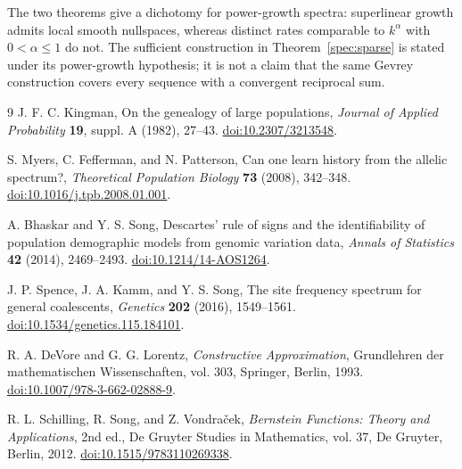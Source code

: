 \documentclass[11pt]{article}
\theoremstyle{definition}
\theoremstyle{remark}
\numberwithin{equation}{section}
\begin{document}
The two theorems give a dichotomy for power-growth spectra:
superlinear growth admits local smooth nullspaces, whereas distinct
rates comparable to $k^\alpha$ with $0<\alpha\le1$ do not.
The sufficient construction in Theorem~\ref{spec:sparse} is stated
under its power-growth hypothesis; it is not a claim that the same
Gevrey construction covers every sequence with a convergent
reciprocal sum.


\begin{thebibliography}{9}
J. F. C. Kingman,
On the genealogy of large populations,
\emph{Journal of Applied Probability} \textbf{19}, suppl. A
(1982), 27--43.
\href{https://doi.org/10.2307/3213548}{doi:10.2307/3213548}.

S. Myers, C. Fefferman, and N. Patterson,
Can one learn history from the allelic spectrum?,
\emph{Theoretical Population Biology} \textbf{73} (2008), 342--348.
\href{https://doi.org/10.1016/j.tpb.2008.01.001}{doi:10.1016/j.tpb.2008.01.001}.

A. Bhaskar and Y. S. Song,
Descartes' rule of signs and the identifiability of population
demographic models from genomic variation data,
\emph{Annals of Statistics} \textbf{42} (2014), 2469--2493.
\href{https://doi.org/10.1214/14-AOS1264}{doi:10.1214/14-AOS1264}.

J. P. Spence, J. A. Kamm, and Y. S. Song,
The site frequency spectrum for general coalescents,
\emph{Genetics} \textbf{202} (2016), 1549--1561.
\href{https://doi.org/10.1534/genetics.115.184101}{doi:10.1534/genetics.115.184101}.

R. A. DeVore and G. G. Lorentz,
\emph{Constructive Approximation},
Grundlehren der mathematischen Wissenschaften, vol. 303,
Springer, Berlin, 1993.
\href{https://doi.org/10.1007/978-3-662-02888-9}{doi:10.1007/978-3-662-02888-9}.

R. L. Schilling, R. Song, and Z. Vondra\v{c}ek,
\emph{Bernstein Functions: Theory and Applications}, 2nd ed.,
De Gruyter Studies in Mathematics, vol. 37,
De Gruyter, Berlin, 2012.
\href{https://doi.org/10.1515/9783110269338}{doi:10.1515/9783110269338}.
\end{thebibliography}
\end{document}
